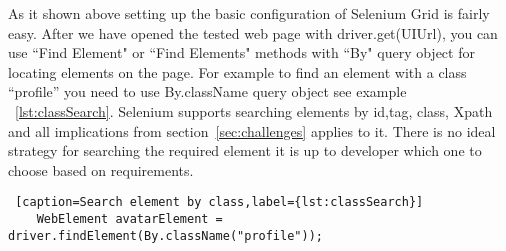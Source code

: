 	As it shown above setting up the basic configuration of Selenium Grid is fairly
	easy. After we have opened the tested web page with driver.get(UIUrl), you can
	use ``Find Element" or ``Find Elements" methods with ``By" query object for
	locating elements on the page. For example to find an element with a
	class ``profile'' you need to use By.className query object see example
	~\ref{lst:classSearch}. Selenium  supports searching elements by id,tag, class,
	Xpath and all implications from section~\ref{sec:challenges} applies to it. 
	There is no ideal strategy for searching the required element it is up
	to developer which one to choose based on requirements.
	
	\lstset{style=a1listing}
	\begin{lstlisting} [caption=Search element by class,label={lst:classSearch}]
	WebElement avatarElement = driver.findElement(By.className("profile"));
	\end{lstlisting}